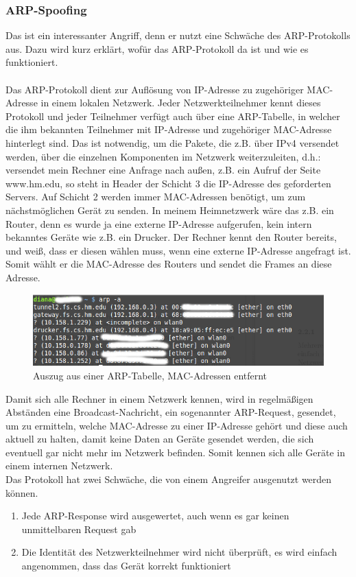 \subsubsection{ARP-Spoofing}
Das ist ein interessanter Angriff, denn er nutzt eine Schwäche des ARP-Protokolls aus.
Dazu wird kurz erklärt, wofür das ARP-Protokoll da ist und wie es funktioniert.
\\ \\
Das ARP-Protokoll dient zur Auflösung von IP-Adresse zu zugehöriger MAC-Adresse in einem lokalen Netzwerk.
Jeder Netzwerkteilnehmer kennt dieses Protokoll und jeder Teilnehmer verfügt auch über eine ARP-Tabelle, in welcher die ihm bekannten Teilnehmer mit IP-Adresse und zugehöriger MAC-Adresse hinterlegt sind. Das ist notwendig, um die Pakete, die z.B. über IPv4 versendet werden, über die einzelnen Komponenten im Netzwerk weiterzuleiten, d.h.: versendet mein Rechner eine Anfrage nach außen, z.B. ein Aufruf der Seite www.hm.edu, so steht in Header der Schicht 3 die IP-Adresse des geforderten Servers. Auf Schicht 2 werden immer MAC-Adressen benötigt, um zum nächstmöglichen Gerät zu senden. In meinem Heimnetzwerk wäre das z.B. ein Router, denn es wurde ja eine externe IP-Adresse aufgerufen, kein intern bekanntes Geräte wie z.B. ein Drucker. Der Rechner kennt den Router bereits, und weiß, dass er diesen wählen muss, wenn eine externe IP-Adresse angefragt ist. Somit wählt er die MAC-Adresse des Routers und sendet die Frames an diese Adresse.
\begin{figure}
	\centering
	\includegraphics[width=1\linewidth]{images/arp-tabelle.png}
	\caption{Auszug aus einer ARP-Tabelle, MAC-Adressen entfernt}
\end{figure}

Damit sich alle Rechner in einem Netzwerk kennen, wird in regelmäßigen Abständen eine Broadcast-Nachricht, ein sogenannter ARP-Request, gesendet, um zu ermitteln, welche MAC-Adresse zu einer IP-Adresse gehört und diese auch aktuell zu halten, damit keine Daten an Geräte gesendet werden, die sich eventuell gar nicht mehr im Netzwerk befinden. Somit kennen sich alle Geräte in einem internen Netzwerk.
\\
Das Protokoll hat zwei Schwäche, die von einem Angreifer ausgenutzt werden können.\cite[vgl.]{Psarros}
\begin{enumerate}
	\item Jede ARP-Response wird ausgewertet, auch wenn es gar keinen unmittelbaren Request gab
	\item Die Identität des Netzwerkteilnehmer wird nicht überprüft, es wird einfach angenommen, dass das Gerät korrekt funktioniert
\end{enumerate}

